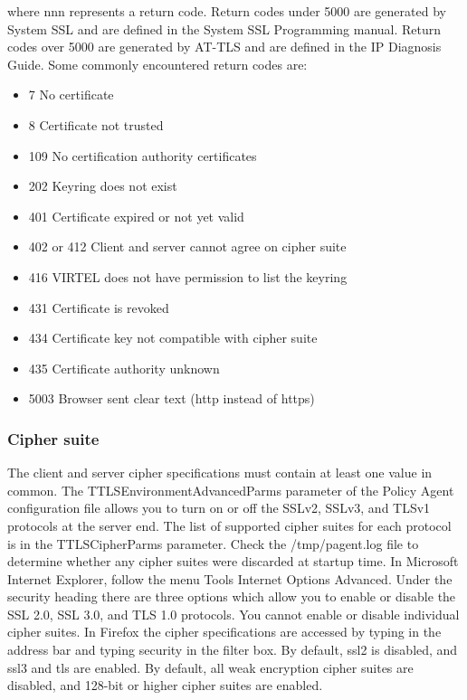 \documentclass[letterpaper,10pt,english]{sphinxmanual}
\begin{document}
where nnn represents a return code. Return codes under 5000 are generated by System SSL and are defined in the System SSL Programming manual. Return codes over 5000 are generated by AT-TLS and are defined in the IP Diagnosis Guide. Some commonly encountered return codes are:
\begin{itemize}
\item {} 
7 No certificate

\item {} 
8 Certificate not trusted

\item {} 
109 No certification authority certificates

\item {} 
202 Keyring does not exist

\item {} 
401 Certificate expired or not yet valid

\item {} 
402 or 412 Client and server cannot agree on cipher suite

\item {} 
416 VIRTEL does not have permission to list the keyring

\item {} 
431 Certificate is revoked

\item {} 
434 Certificate key not compatible with cipher suite

\item {} 
435 Certificate authority unknown

\item {} 
5003 Browser sent clear text (http instead of https)

\end{itemize}


\subsubsection{Cipher suite}
\label{\detokenize{Customization:cipher-suite}}
The client and server cipher specifications must contain at least one value in common. The TTLSEnvironmentAdvancedParms parameter of the Policy Agent configuration file allows you to turn on or off the SSLv2, SSLv3, and TLSv1 protocols at the server end. The list of supported cipher suites for each protocol is in the TTLSCipherParms parameter. Check the /tmp/pagent.log file to determine whether any cipher suites were discarded at startup time. In Microsoft Internet Explorer, follow the menu Tools \textendash{} Internet Options \textendash{} Advanced. Under the security heading there are three options which allow you to enable or disable the SSL 2.0, SSL 3.0, and TLS 1.0 protocols. You cannot enable or disable individual cipher suites.
In Firefox the cipher specifications are accessed by typing  in the address bar and typing security in the filter box. By default, ssl2 is disabled, and ssl3 and tls are enabled. By default, all weak encryption cipher suites are disabled, and 128-bit or higher cipher suites are enabled.
\end{document}
